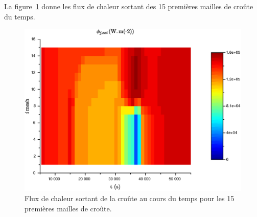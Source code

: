 La figure~\ref{fig:phi_ext} donne les flux de chaleur sortant des 15 premières mailles de croûte du temps.
\begin{figure}
\centering
\includegraphics[width=\textwidth, keepaspectratio=true]{Figures/phi_ext.eps}
\caption{Flux de chaleur sortant de la croûte au cours du temps pour les 15 premières mailles de croûte.}
\label{fig:phi_ext}
\end{figure}
